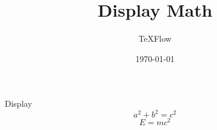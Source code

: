 \documentclass[aspectratio=43]{beamer}
\title{Display Math}
\author{TeXFlow}
\date{\today}
\begin{document}
\begin{frame}{Display}
\[
a^2+b^2=c^2
\]
\begin{equation}
E = mc^2
\end{equation}
\end{frame}
\end{document}
